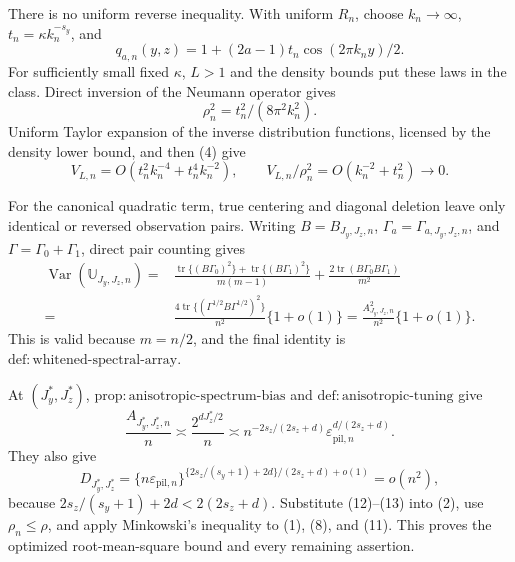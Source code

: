 There is no uniform reverse inequality.  With uniform \(R_n\), choose \(k_n\to\infty\), \(t_n=\kappa k_n^{-s_y}\), and
\[
q_{a,n}(y,z)=1+(2a-1)t_n\cos(2\pi k_ny)/2.
\]
For sufficiently small fixed \(\kappa\), \(L>1\) and the density bounds put these laws in the class.  Direct inversion of the Neumann operator gives
\[
\rho_n^2=t_n^2/(8\pi^2k_n^2). \tag{9}
\]
Uniform Taylor expansion of the inverse distribution functions, licensed by the density lower bound, and then (4) give
\[
V_{L,n}=O(t_n^2k_n^{-4}+t_n^4k_n^{-2}),
\qquad
V_{L,n}/\rho_n^2=O(k_n^{-2}+t_n^2)\to0. \tag{10}
\]

For the canonical quadratic term, true centering and diagonal deletion leave only identical or reversed observation pairs.  Writing \(B=B_{J_y,J_z,n}\), \(\Gamma_a=\Gamma_{a,J_y,J_z,n}\), and \(\Gamma=\Gamma_0+\Gamma_1\), direct pair counting gives
\begin{equation}
\begin{split}
\operatorname{Var}(\mathbb U_{J_y,J_z,n})={}&
\frac{\operatorname{tr}\{(B\Gamma_0)^2\}+\operatorname{tr}\{(B\Gamma_1)^2\}}{m(m-1)}
+\frac{2\operatorname{tr}(B\Gamma_0B\Gamma_1)}{m^2}\\
={}&\frac{4\operatorname{tr}\{(\Gamma^{1/2}B\Gamma^{1/2})^2\}}{n^2}\{1+o(1)\}
=\frac{A_{J_y,J_z,n}^2}{n^2}\{1+o(1)\}.
\end{split}
\tag{11}\end{equation}
This is valid because \(m=n/2\), and the final identity is \(\mathrm{def{:}whitened\text{-}spectral\text{-}array}\).

At \((J_y^*,J_z^*)\), \(\mathrm{prop{:}anisotropic\text{-}spectrum\text{-}bias}\) and \(\mathrm{def{:}anisotropic\text{-}tuning}\) give
\[
\frac{A_{J_y^*,J_z^*,n}}n
\asymp\frac{2^{dJ_z^*/2}}n
\asymp n^{-2s_z/(2s_z+d)}
\varepsilon_{\mathrm{pil},n}^{d/(2s_z+d)}. \tag{12}
\]
They also give
\[
D_{J_y^*,J_z^*}
=\{n\varepsilon_{\mathrm{pil},n}\}^{\{2s_z/(s_y+1)+2d\}/(2s_z+d)+o(1)}
=o(n^2), \tag{13}
\]
because \(2s_z/(s_y+1)+2d<2(2s_z+d)\).  Substitute (12)--(13) into (2), use \(\rho_n\le\rho\), and apply Minkowski's inequality to (1), (8), and (11).  This proves the optimized root-mean-square bound and every remaining assertion.